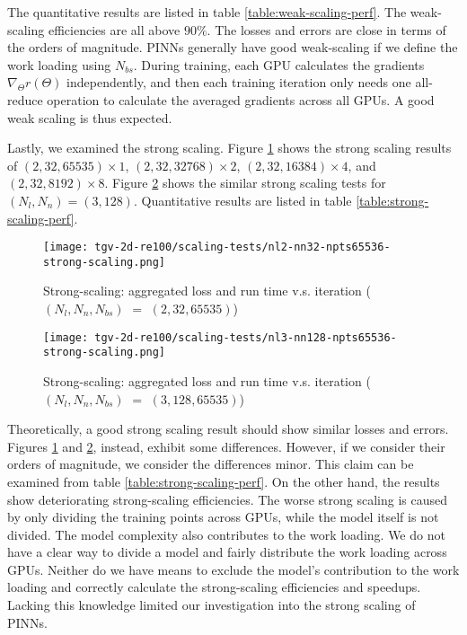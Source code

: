 

The quantitative results are listed in table \ref{table:weak-scaling-perf}.
The weak-scaling efficiencies are all above $90\%$.
The losses and errors are close in terms of the orders of magnitude.
PINNs generally have good weak-scaling if we define the work loading using $N_{bs}$.
During training, each GPU calculates the gradients $\nabla_{\Theta} r(\Theta)$ independently, and then each training iteration only needs one all-reduce operation to calculate the averaged gradients across all GPUs.
A good weak scaling is thus expected.

Lastly, we examined the strong scaling.
Figure \ref{fig:nl2-nn32-npts65536-strong-scaling} shows the strong scaling results of $(2, 32, 65535)\times 1$, $(2, 32, 32768)\times 2$, $(2, 32, 16384)\times 4$, and $(2, 32, 8192)\times 8$.
Figure \ref{fig:nl3-nn128-npts65536-strong-scaling} shows the similar strong scaling tests for $(N_l, N_n)=(3, 128)$.
Quantitative results are listed in table \ref{table:strong-scaling-perf}. 

\begin{figure}[hbt!]
    \centering%
    \texttt{[image: tgv-2d-re100/scaling-tests/nl2-nn32-npts65536-strong-scaling.png]}
    \caption[%
        Strong-scaling: aggregated loss and run time v.s. iteration ($(N_l, N_n, N_{bs})$ $=$ $(2, 32, 65535)$)%
    ]{%
        Strong-scaling: aggregated loss and run time v.s. iteration ($(N_l, N_n, N_{bs})$ $=$ $(2, 32, 65535)$)%
    }\label{fig:nl2-nn32-npts65536-strong-scaling}
\end{figure}

\begin{figure}[hbt!]
    \centering%
    \texttt{[image: tgv-2d-re100/scaling-tests/nl3-nn128-npts65536-strong-scaling.png]}
    \caption[%
        Strong-scaling: aggregated loss and run time v.s. iteration ($(N_l, N_n, N_{bs})$ $=$ $(3, 128, 65535)$)%
    ]{%
        Strong-scaling: aggregated loss and run time v.s. iteration ($(N_l, N_n, N_{bs})$ $=$ $(3, 128, 65535)$)%
    }\label{fig:nl3-nn128-npts65536-strong-scaling}
\end{figure}

Theoretically, a good strong scaling result should show similar losses and errors.
Figures \ref{fig:nl2-nn32-npts65536-strong-scaling} and \ref{fig:nl3-nn128-npts65536-strong-scaling}, instead, exhibit some differences.
However, if we consider their orders of magnitude, we consider the differences minor.
This claim can be examined from table \ref{table:strong-scaling-perf}.
On the other hand, the results show deteriorating strong-scaling efficiencies.
The worse strong scaling is caused by only dividing the training points across GPUs, while the model itself is not divided.  
The model complexity also contributes to the work loading.
We do not have a clear way to divide a model and fairly distribute the work loading across GPUs.
Neither do we have means to exclude the model's contribution to the work loading and correctly calculate the strong-scaling efficiencies and speedups.
Lacking this knowledge limited our investigation into the strong scaling of PINNs.


